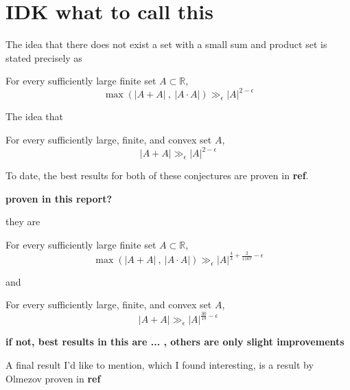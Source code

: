 \documentclass[12pt]{amsart}
\begin{document}


\section{ \textbf{IDK what to call this}}
The idea that there does not exist a set with a small sum and product set is
stated precisely as
\begin{conjecture}
For every sufficiently large finite set \(A \subset \mathbb{R} \),
\[
    \max \left( \left\lvert A+A \right\rvert ~,~ \left\lvert A \cdot A \right\rvert  \right) \gg_{\epsilon}  \left\lvert A \right\rvert^{2-\epsilon}
\]
\end{conjecture}

The idea that 

\begin{conjecture}
    For every sufficiently large, finite, and convex set \(A\),
    \[
        \left\lvert A+A \right\rvert \gg_{\epsilon}  \left\lvert A \right\rvert ^{2-\epsilon}
    \]
\end{conjecture}

To date, the best results for both of these conjectures are proven in \textbf{ref}.

\textbf{proven in this report?}

they are
\begin{theorem}
    For every sufficiently large finite set \(A \subset \mathbb{R} \),
    \[
        \max \left( \left\lvert A+A \right\rvert ~,~ \left\lvert A \cdot A \right\rvert  \right) \gg_{\epsilon}   \left\lvert A \right\rvert^{\frac{4}{3} + \frac{2}{1167} - \epsilon}
    \]
\end{theorem}

and

\begin{theorem}
    For every sufficiently large, finite, and convex set \(A\),
    \[
        \left\lvert A+A \right\rvert \gg_{\epsilon}  \left\lvert A \right\rvert ^{\frac{30}{19} - \epsilon }
    \]
\end{theorem}

\textbf{if not, best results in this are ... , others are only slight improvements}

A final result I'd like to mention, which I found interesting, is a result by Olmezov
proven in \textbf{ref}
\end{document}
